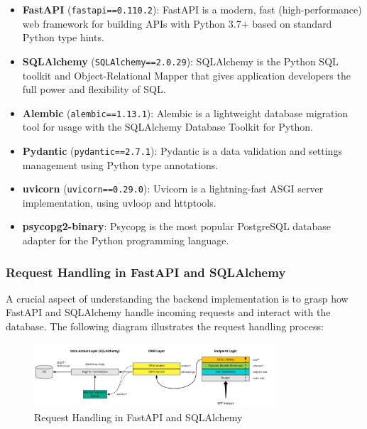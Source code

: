 \begin{itemize}
    \item \textbf{FastAPI} (\texttt{fastapi==0.110.2}): FastAPI is a modern, fast (high-performance) web framework for building APIs with Python 3.7+ based on standard Python type hints.

    \item \textbf{SQLAlchemy} (\texttt{SQLAlchemy==2.0.29}): SQLAlchemy is the Python SQL toolkit and Object-Relational Mapper that gives application developers the full power and flexibility of SQL.

    \item \textbf{Alembic} (\texttt{alembic==1.13.1}): Alembic is a lightweight database migration tool for usage with the SQLAlchemy Database Toolkit for Python.

    \item \textbf{Pydantic} (\texttt{pydantic==2.7.1}): Pydantic is a data validation and settings management using Python type annotations.

    \item \textbf{uvicorn} (\texttt{uvicorn==0.29.0}): Uvicorn is a lightning-fast ASGI server implementation, using uvloop and httptools.

    \item \textbf{psycopg2-binary}: Psycopg is the most popular PostgreSQL database adapter for the Python programming language.
\end{itemize}

\subsubsection{Request Handling in FastAPI and SQLAlchemy}

A crucial aspect of understanding the backend implementation is to grasp how FastAPI and SQLAlchemy handle incoming requests and interact with the database. The following diagram illustrates the request handling process:

\begin{figure}[h]
    \centering
    \includegraphics[width=0.8\textwidth]{images/request_handling_diagram}
    \caption{Request Handling in FastAPI and SQLAlchemy \citet{samiullah_fastapi_tutorial}}
    \label{fig:request_handling}
\end{figure}



